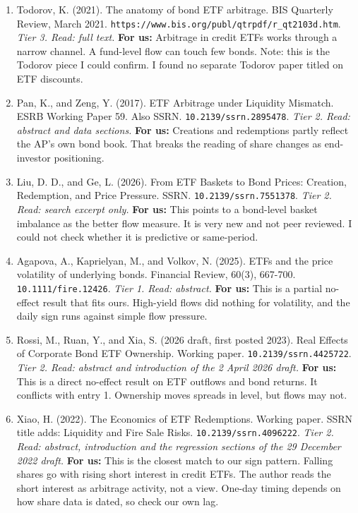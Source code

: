 \begin{enumerate}[leftmargin=*,itemsep=3pt]
\item Todorov, K. (2021). The anatomy of bond ETF arbitrage. BIS Quarterly Review, March 2021. \nolinkurl{https://www.bis.org/publ/qtrpdf/r\_qt2103d.htm}. \emph{Tier 3. Read: full text.} \textbf{For us:} Arbitrage in credit ETFs works through a narrow channel. A fund-level flow can touch few bonds. Note: this is the Todorov piece I could confirm. I found no separate Todorov paper titled on ETF discounts.
\item Pan, K., and Zeng, Y. (2017). ETF Arbitrage under Liquidity Mismatch. ESRB Working Paper 59. Also SSRN. \nolinkurl{10.2139/ssrn.2895478}. \emph{Tier 2. Read: abstract and data sections.} \textbf{For us:} Creations and redemptions partly reflect the AP's own bond book. That breaks the reading of share changes as end-investor positioning.
\item Liu, D. D., and Ge, L. (2026). From ETF Baskets to Bond Prices: Creation, Redemption, and Price Pressure. SSRN. \nolinkurl{10.2139/ssrn.7551378}. \emph{Tier 2. Read: search excerpt only.} \textbf{For us:} This points to a bond-level basket imbalance as the better flow measure. It is very new and not peer reviewed. I could not check whether it is predictive or same-period.
\item Agapova, A., Kaprielyan, M., and Volkov, N. (2025). ETFs and the price volatility of underlying bonds. Financial Review, 60(3), 667-700. \nolinkurl{10.1111/fire.12426}. \emph{Tier 1. Read: abstract.} \textbf{For us:} This is a partial no-effect result that fits ours. High-yield flows did nothing for volatility, and the daily sign runs against simple flow pressure.
\item Rossi, M., Ruan, Y., and Xia, S. (2026 draft, first posted 2023). Real Effects of Corporate Bond ETF Ownership. Working paper. \nolinkurl{10.2139/ssrn.4425722}. \emph{Tier 2. Read: abstract and introduction of the 2 April 2026 draft.} \textbf{For us:} This is a direct no-effect result on ETF outflows and bond returns. It conflicts with entry 1. Ownership moves spreads in level, but flows may not.
\item Xiao, H. (2022). The Economics of ETF Redemptions. Working paper. SSRN title adds: Liquidity and Fire Sale Risks. \nolinkurl{10.2139/ssrn.4096222}. \emph{Tier 2. Read: abstract, introduction and the regression sections of the 29 December 2022 draft.} \textbf{For us:} This is the closest match to our sign pattern. Falling shares go with rising short interest in credit ETFs. The author reads the short interest as arbitrage activity, not a view. One-day timing depends on how share data is dated, so check our own lag.

\end{enumerate}
